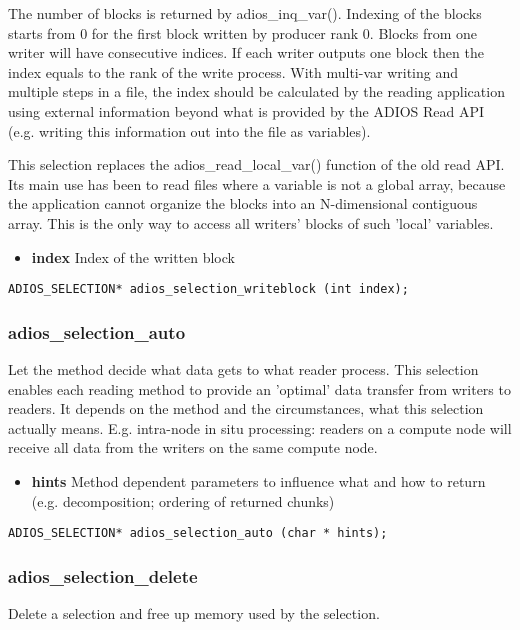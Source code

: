 The number of blocks is returned by adios\_inq\_var(). 
Indexing of the blocks starts from 0 for the first block
written by producer rank 0. Blocks from one writer will have consecutive indices. 
If each writer outputs one block then the index equals to the rank of the write process. 
With multi-var writing and multiple steps in a file, the index should be
calculated by the reading application using external information beyond
what is provided by the ADIOS Read API 
(e.g. writing this information out into the file as variables).

This selection replaces the adios\_read\_local\_var() function of the old read API. 
Its main use has been to read files where a variable is not a global array, because 
the application cannot organize the blocks into an N-dimensional contiguous array. 
This is the only way to access all writers' blocks of such 'local' variables.

\begin{itemize} 
\item{\bf index}    Index of the written block
\end{itemize}

\begin{lstlisting}[alsolanguage=C]
ADIOS_SELECTION* adios_selection_writeblock (int index);
\end{lstlisting}


\subsubsection{adios\_selection\_auto}
Let the method decide what data gets to what reader process.
This selection enables each reading method to provide an 'optimal'
data transfer from writers to readers. It depends on the method and the 
circumstances, what this selection actually means.
E.g. intra-node in situ processing: readers on a compute node will receive all data 
from the writers on the same compute node.

\begin{itemize} 
\item{\bf hints}    Method dependent parameters to influence what and how to 
 return (e.g. decomposition; ordering of returned chunks)
\end{itemize} 

\begin{lstlisting}[alsolanguage=C]
ADIOS_SELECTION* adios_selection_auto (char * hints);
\end{lstlisting}


\subsubsection{adios\_selection\_delete}
Delete a selection and free up memory used by the selection.

